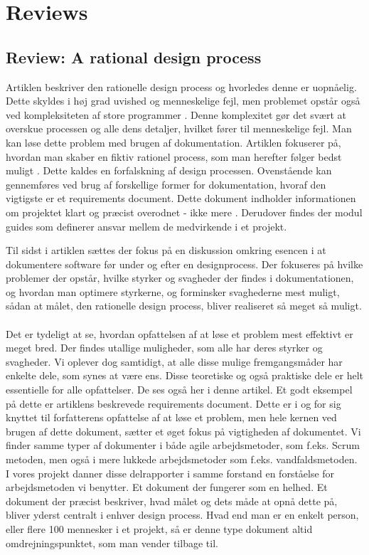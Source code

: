 \documentclass[a4paper,12pt]{article}
\begin{document}
\section{Reviews}
\subsection{Review: A rational design process}
Artiklen beskriver den rationelle design process og hvorledes denne er uopnåelig. Dette skyldes i høj grad uvished og menneskelige fejl, men problemet opstår også ved kompleksiteten af store programmer \cite[side~251]{ardp}. Denne komplexitet gør det svært at overskue processen og alle dens detaljer, hvilket fører til menneskelige fejl. Man kan løse dette problem med brugen af dokumentation.
Artiklen fokuserer på, hvordan man skaber en fiktiv rationel process, som man herefter følger bedst muligt \cite[side~252]{ardp}.
Dette kaldes en forfalskning af design processen.
Ovenstående kan gennemføres ved brug af forskellige former for dokumentation, hvoraf den vigtigste er et
requirements document. Dette dokument indholder informationen om projektet klart og præcist overodnet - ikke mere \cite[side~252-253]{ardp}.
Derudover findes der modul guides som definerer ansvar mellem de medvirkende i et projekt.

Til sidst i artiklen sættes der fokus på en diskussion omkring esencen i at dokumentere software før under og efter en designprocess. Der fokuseres på hvilke problemer der opstår, hvilke styrker og svagheder der findes i dokumentationen, og hvordan man optimere styrkerne, og forminsker svaghederne mest muligt, sådan at målet, den rationelle design process, bliver realiseret så meget så muligt\cite[side~255]{ardp}.
\\
\\
Det er tydeligt at se, hvordan opfattelsen af at løse et problem mest effektivt er meget bred. Der findes utallige muligheder, som alle har deres styrker og svagheder. Vi oplever dog samtidigt, at alle disse mulige fremgangsmåder har enkelte dele, som synes at være ens. Disse teoretiske og også praktiske dele er helt essentielle for alle opfattelser. De ses også her i denne artikel. Et godt eksempel på dette er artiklens beskrevede requirements document. Dette er i og for sig knyttet til forfatterens opfattelse af at løse et problem, men hele kernen ved brugen af dette dokument, sætter et øget fokus på vigtigheden af dokumentet. Vi finder samme typer af dokumenter i både agile arbejdsmetoder, som f.eks. Scrum metoden, men også i mere lukkede arbejdsmetoder som f.eks. vandfaldsmetoden. I vores projekt danner disse delrapporter i samme forstand en forståelse for arbejdsmetoden vi benytter. Et dokument der fungerer som en helhed. Et dokument der præcist beskriver, hvad målet og dets måde at opnå dette på, bliver yderst centralt i enhver design process. Hvad end man er en enkelt person, eller flere 100 mennesker i et projekt, så er denne type dokument altid omdrejningspunktet, som man vender tilbage til.
\end{document}
